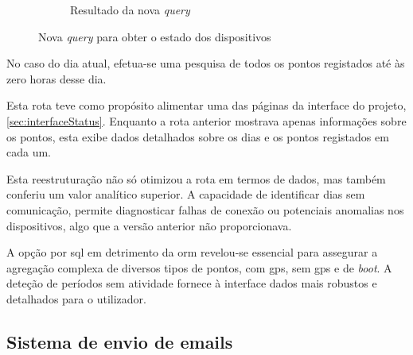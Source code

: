 \begin{figure}[!h]
\begin{subfigure}[c]{0.45\textwidth}
		\caption{Resultado da nova \textit{query}}
        \label{fig:returnNewQuery}
	\end{subfigure}
	\caption{Nova \textit{query} para obter o estado dos dispositivos}
\end{figure}


No caso do dia atual, efetua-se uma pesquisa de todos os pontos registados até às zero horas desse dia.

Esta rota teve como propósito alimentar uma das páginas da interface do projeto, \autoref{sec:interfaceStatus}. Enquanto a rota anterior mostrava apenas informações sobre os pontos, esta exibe dados detalhados sobre os dias e os pontos registados em cada um.

Esta reestruturação não só otimizou a rota em termos de dados, mas também conferiu um valor analítico superior. A capacidade de identificar dias sem comunicação, permite diagnosticar falhas de conexão ou potenciais anomalias nos dispositivos, algo que a versão anterior não proporcionava.

A opção por \acs{sql} em detrimento da \acs{orm} revelou-se essencial para assegurar a agregação complexa de diversos tipos de pontos, com \acs{gps}, sem \acs{gps} e de \textit{boot}. A deteção de períodos sem atividade fornece à interface dados mais robustos e detalhados para o utilizador.

\clearpage
\subsection{Sistema de envio de emails} %



